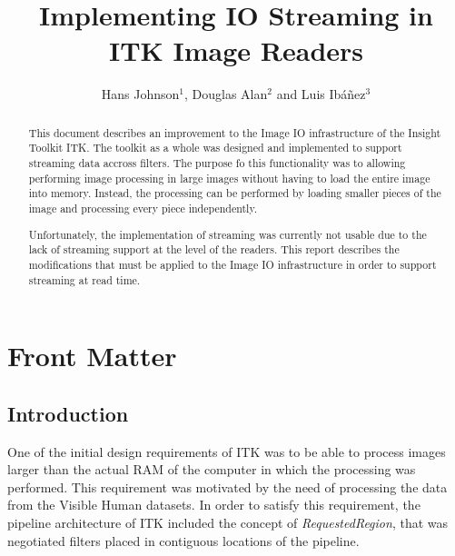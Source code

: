 \documentclass{InsightArticle}
\title{Implementing IO Streaming in ITK Image Readers}
\author{Hans Johnson$^{1}$, Douglas Alan$^{2}$ and Luis Ib\'{a}\~{n}ez$^{3}$}
\begin{document}
\ifpdf
\else
\fi


\maketitle


\ifhtml
\chapter*{Front Matter\label{front}}
\fi


\begin{abstract}
\noindent
This document describes an improvement to the Image IO infrastructure of the
Insight Toolkit ITK. The toolkit as a whole was designed and implemented to
support streaming data accross filters. The purpose fo this functionality was
to allowing performing image processing in large images without having to load
the entire image into memory. Instead, the processing can be performed by
loading smaller pieces of the image and processing every piece independently.

Unfortunately, the implementation of streaming was currently not usable due to
the lack of streaming support at the level of the readers. This report
describes the modifications that must be applied to the Image IO infrastructure
in order to support streaming at read time. 
\end{abstract}

\tableofcontents

\section{Introduction}

One of the initial design requirements of ITK was to be able to process images
larger than the actual RAM of the computer in which the processing was
performed. This requirement was motivated by the need of processing the data
from the Visible Human datasets. In order to satisfy this requirement, the
pipeline architecture of ITK included the concept of \emph{RequestedRegion},
that was negotiated filters placed in contiguous locations of the pipeline.
\end{document}
